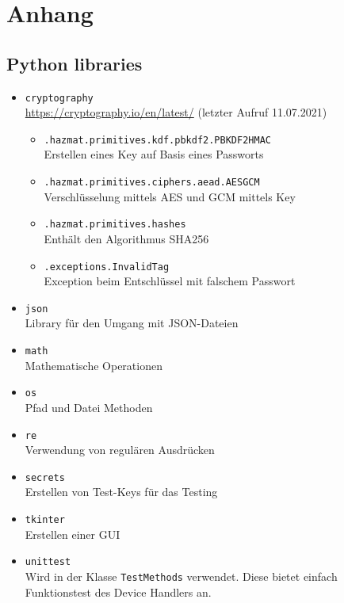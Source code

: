 \documentclass[a4paper,titlepage]{article}
\newcommand{\ilc}[1]{\textcolor{codeColor}{\texttt{#1}}}
\begin{document}

\clearpage
\section*{Anhang}
    	\renewcommand\thesubsection{Anhang \arabic{subsection}} %
   	\renewcommand\thesubsubsection{\arabic{subsection}.\arabic{subsubsection}} %
   	\setcounter{figure}{0} 
   	  
	\subsection{Python libraries} \label{libraries} %
		\begin{itemize}
			\item \ilc{cryptography} \\
				\url{https://cryptography.io/en/latest/} (letzter Aufruf 11.07.2021)
				\begin{itemize}[label={}]
				\item \ilc{.hazmat.primitives.kdf.pbkdf2.PBKDF2HMAC} \\
					Erstellen eines Key auf Basis eines Passworts
				\item \ilc{.hazmat.primitives.ciphers.aead.AESGCM} \\
					Verschlüsselung mittels AES und GCM mittels Key
				\item \ilc{.hazmat.primitives.hashes}\\
					Enthält den Algorithmus SHA256
				\item \ilc{.exceptions.InvalidTag}\\
					Exception beim Entschlüssel mit falschem Passwort 
				\end{itemize}
			\item \ilc{json} \\
				Library für den Umgang mit JSON-Dateien
			\item \ilc{math} \\
				Mathematische Operationen
			\item \ilc{os} \\
				Pfad und Datei Methoden
			\item \ilc{re} \\
				Verwendung von regulären Ausdrücken	
			\item \ilc{secrets} \\
				Erstellen von Test-Keys für das Testing
			\item \ilc{tkinter} \\
				Erstellen einer GUI				
			\item \ilc{unittest} \\
				Wird in der Klasse \ilc{TestMethods} verwendet. Diese bietet einfach Funktionstest des Device Handlers an.
		\end{itemize}
		
\end{document}
